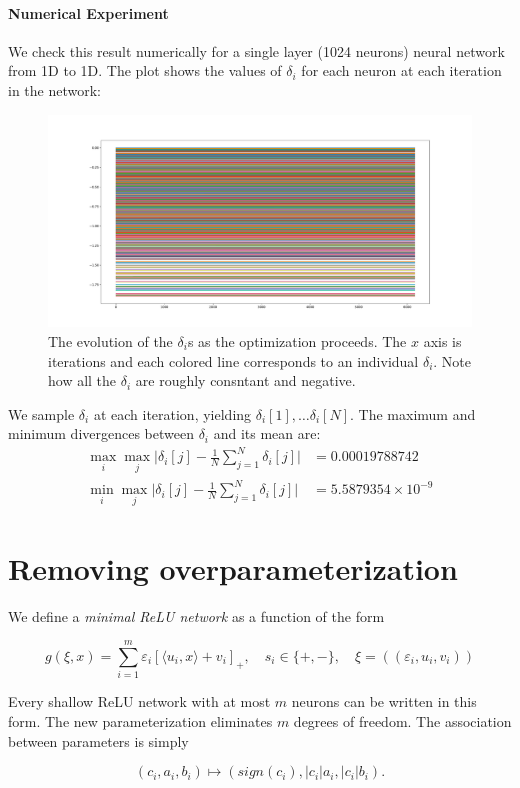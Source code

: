 \documentclass{article}
\begin{document}
\paragraph{Numerical Experiment}
We check this result numerically for a single layer (1024 neurons) neural network from 1D to 1D. The plot shows the values of $\delta_i$ for each neuron at each iteration in the network:
\begin{figure}[h!]
    \centering
    \includegraphics[width=\textwidth]{figures/delta_i.pdf}
    \caption{The evolution of the $\delta_i$s as the optimization proceeds. The $x$ axis is iterations and each colored line corresponds to an individual $\delta_i$. Note how all the $\delta_i$ are roughly consntant and negative.} 
    \label{fig:my_label}
\end{figure}

We sample $\delta_i$ at each iteration, yielding $\delta_i[1], \ldots \delta_i[N]$. The maximum and minimum divergences between $\delta_i$ and its mean are:
\begin{align*}
\max_i \max_j \bigg|\delta_i[j] - \frac{1}{N}\sum_{j=1}^N \delta_i[j]\bigg| &= 0.00019788742 \\
\min_i \max_j \bigg|\delta_i[j] - \frac{1}{N}\sum_{j=1}^N \delta_i[j]\bigg| &= 5.5879354\times10^{-9}
\end{align*}

\section{Removing overparameterization}

We define a \emph{minimal ReLU network} as a function of the form

\begin{equation}
g(\xi, x) = \sum_{i=1}^{m} \varepsilon_i [\langle u_i, x \rangle + v_i]_+, \quad s_i \in \{+, - \}, \quad \xi=((\varepsilon_i,u_i,v_i))
\end{equation}

Every shallow ReLU network with at most \(m\) neurons can be written in
this form. The new parameterization eliminates \(m\) degrees of freedom.
The association between parameters is simply

\begin{equation}
(c_i,a_i,b_i) \mapsto (sign(c_i), |c_i| a_i, |c_i| b_i).
\end{equation}
\end{document}
